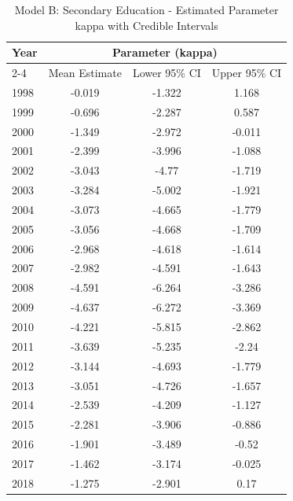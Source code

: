 \begin{landscape}
\begin{table}[htbp]
\centering
\caption{Model B: Secondary Education - Estimated Parameter kappa  with Credible Intervals}
\label{tab:Fparameters_k7}
\begin{tabular}{@{}lccc@{}}
\toprule
Year & \multicolumn{3}{c}{Parameter (kappa)} \\
\cmidrule(lr){2-4}
      & Mean Estimate & Lower 95\% CI & Upper 95\% CI \\
\midrule
1998 & -0.019 & -1.322 & 1.168 \\
1999 & -0.696 & -2.287 & 0.587 \\
2000 & -1.349 & -2.972 & -0.011 \\
2001 & -2.399 & -3.996 & -1.088 \\
2002 & -3.043 & -4.77 & -1.719 \\
2003 & -3.284 & -5.002 & -1.921 \\
2004 & -3.073 & -4.665 & -1.779 \\
2005 & -3.056 & -4.668 & -1.709 \\
2006 & -2.968 & -4.618 & -1.614 \\
2007 & -2.982 & -4.591 & -1.643 \\
2008 & -4.591 & -6.264 & -3.286 \\
2009 & -4.637 & -6.272 & -3.369 \\
2010 & -4.221 & -5.815 & -2.862 \\
2011 & -3.639 & -5.235 & -2.24 \\
2012 & -3.144 & -4.693 & -1.779 \\
2013 & -3.051 & -4.726 & -1.657 \\
2014 & -2.539 & -4.209 & -1.127 \\
2015 & -2.281 & -3.906 & -0.886 \\
2016 & -1.901 & -3.489 & -0.52 \\
2017 & -1.462 & -3.174 & -0.025 \\
2018 & -1.275 & -2.901 & 0.17 \\
\bottomrule
\end{tabular}
\end{table}
\end{landscape}